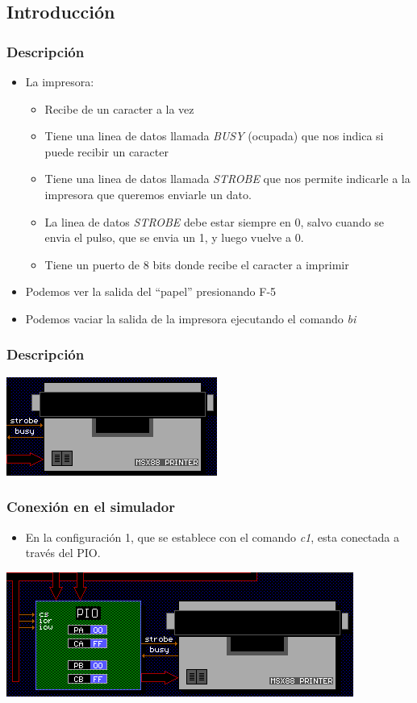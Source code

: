 \documentclass{beamer}
\begin{document}
\subsection{Introducción}
\begin{frame}
\frametitle{Descripción}
\begin{itemize}
  \item La impresora:
  \begin{itemize}
      \item Recibe de un caracter a la vez
      \item Tiene una linea de datos llamada \emph{BUSY} (ocupada) que nos indica si puede recibir un caracter
      \item Tiene una linea de datos llamada \emph{STROBE} que nos permite indicarle a la impresora que queremos enviarle un dato.
      \item La linea de datos \emph{STROBE} debe estar siempre en 0, salvo cuando se envia el pulso, que se envia un 1, y luego vuelve a 0.
      \item Tiene un puerto de 8 bits donde recibe el caracter a imprimir
  \end{itemize}
 \item Podemos ver la salida del ``papel'' presionando F-5
 \item Podemos vaciar la salida de la impresora ejecutando el comando \emph{bi}
\end{itemize}
\end{frame}

\begin{frame}
\frametitle{Descripción}
\begin{center}
 \includegraphics[scale=0.75]{impresora.png}
\end{center}
\end{frame}


\begin{frame}
\frametitle{Conexión en el simulador}
  \begin{itemize}
  \item En la configuración 1, que se establece con el comando \emph{c1}, esta conectada a través del PIO.
\end{itemize}
\begin{center}
 \includegraphics[scale=0.75]{pio1.png}
\end{center}
\end{frame}
\end{document}
